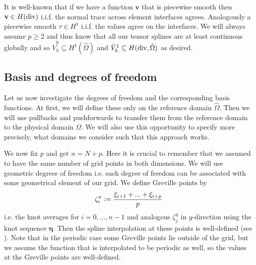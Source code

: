 \documentclass[../master_thesis.tex]{subfiles}
\begin{document}
It is well-known that if we have a function $\mathbf{v}$ that is piecewise smooth 
then $\mathbf{v} \in H(\operatorname{div})$ i.i.f. the normal trace across element interfaces
agrees. Analogously a piecewise smooth $\tau \in H^1$ i.i.f. the values agree 
on the interfaces. We will always assume $p \geq 2$ and thus know that 
all our tensor splines are at least continuous globally and so
$\hat{V}_h^0 \subseteq H^1(\hat{\Omega})$ and $\hat{V}_h^1 \subseteq H(\operatorname{div},\hat{\Omega})$ as desired. 



\subsection{Basis and degrees of freedom}

Let us now investigate the degrees of freedom and the corresponding basis functions. 
At first, we will define these only on the 
reference domain $\hat{\Omega}$. Then we will use
pullbacks and pushforwards to transfer them
from the reference domain to the physical domain $\Omega$. 
We will also use this opportunity to specify more precisely, what domains we consider 
such that this approach works.

We now fix $p$ and get $n = N+p$. Here it is crucial to remember that we assumed to 
have the same number of grid points in both dimensions.
We will use geometric degrees of 
freedom i.e. each degree of freedom can be associated with some geometrical element of our 
grid. We define Greville points by 
\begin{align*}
    \zeta_i^x \vcentcolon= \frac{\xi_{i+1} + ... + \xi_{i+p}}{p}
\end{align*}
i.e. the knot averages for $i=0,...,n-1$ and analogous $\zeta_j^y$ in $y$-direction 
using the knot sequence $\bm{\eta}$. 
Then the spline interpolation at these 
points is well-defined (see \cite[Sec.\,3.3.1]{isogeometric_analysis}).
Note that in the periodic case some Greville points lie outside of 
the grid, but we assume the function that is interpolated to be periodic as well, so
the values at the Greville points are well-defined.
\end{document}
